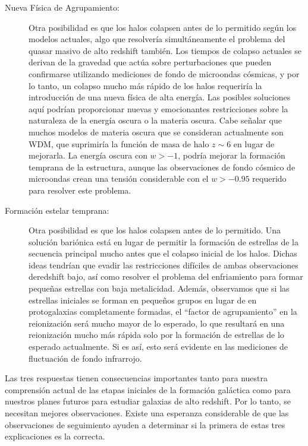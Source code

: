 \documentclass{article}
\begin{document}
\begin{description}
\item[Nueva Física de Agrupamiento:] Otra posibilidad es que los halos colapsen antes de lo permitido
según los modelos actuales, algo que resolvería simultáneamente el problema del quasar masivo de alto redshift también. Los tiempos de colapso actuales se derivan de la gravedad que actúa sobre perturbaciones que pueden confirmarse utilizando mediciones de fondo de microondas cósmicas, y por lo tanto, un colapso mucho más rápido de los halos requeriría la introducción de una nueva física de alta energía. Las posibles soluciones aquí podrían proporcionar nuevas y emocionantes restricciones sobre la naturaleza de la energía oscura o la materia oscura. Cabe señalar que muchos modelos de materia oscura que se consideran actualmente son WDM, que suprimiría la función de masa de halo $z\sim 6$ en lugar de mejorarla. La energía oscura con $w> -1$, podría mejorar la formación temprana de la estructura, aunque las observaciones de fondo cósmico de microondas crean una tensión considerable con el $w> -0.95$ requerido para resolver este problema.

\item[Formación estelar temprana:] Otra posibilidad es que los halos colapsen antes de lo permitido. Una solución bariónica está en lugar de permitir la formación de estrellas de la secuencia principal mucho antes que el colapso inicial de los halos. Dichas ideas tendrían que evadir las restricciones difíciles de ambas observaciones deredshift bajo, así como resolver el problema del enfriamiento para formar pequeñas estrellas con baja metalicidad. Además, observamos que si las estrellas iniciales se forman en pequeños grupos en lugar de en protogalaxias completamente formadas, el ``factor de agrupamiento'' en la reionización será mucho mayor de lo esperado, lo que resultará en una reionización mucho más rápida solo por la formación de estrellas de lo esperado actualmente. Si es así, esto será evidente en las mediciones de fluctuación de fondo infrarrojo.
\end{description}

Las tres respuestas tienen consecuencias importantes tanto para nuestra comprensión actual de las etapas iniciales de la formación galáctica como para nuestros planes futuros para estudiar galaxias de alto redshift. Por lo tanto, se necesitan mejores observaciones. Existe una esperanza considerable de que las observaciones de seguimiento ayuden a determinar si la primera de estas tres explicaciones es la correcta.
\end{document}
